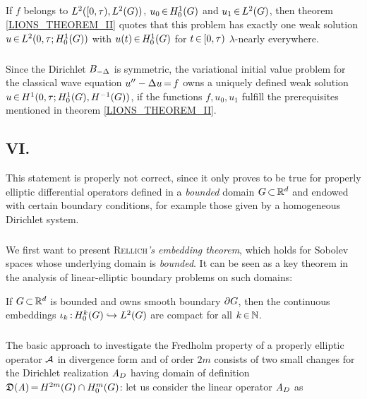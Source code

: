 \documentclass[11pt,twoside]{article}
\def\G{G}
\begin{document}
\subparagraph{}
If $f$ belongs to $L^2([0,\T), \Lh)$,
$u_0 \xeof \HN{1}{\G}$ and $u_1 \xeof \Lh$,
then theorem \ref{LIONS_THEOREM_II} quotes
that this problem has exactly one weak solution $u \xeof L^2(0,\T; \HN{1}{\G})$
with $u(t) \xeof \HN{1}{\G}$ for $t {\,\in\,} [0,\tau)$ $\lambda$-nearly everywhere.

\subparagraph{}
Since the Dirichlet $B_{-\Delta}$ is symmetric,
the variational initial value problem for the classical wave equation
$u'' - \Delta u {\,=\,} f$
owns a uniquely defined weak solution
$u \xeof H^1(0,\T; \HN{1}{\G}, H^{-1}(\G))$,
if the functions $f, u_0, u_1$ fulfill the prerequisites
mentioned in theorem \ref{LIONS_THEOREM_II}.

\subsection*{VI. {\TITLEF}}
This statement is properly not correct,
since it only proves to be true for properly elliptic differential operators
defined in a \textit{bounded} domain $\G \xsubset \Rd$
and endowed with certain boundary conditions,
for example those given by a homogeneous Dirichlet system.

\subparagraph{} %
We first want to present \textsc{Rellich}\textit{'s embedding theorem},
which holds for Sobolev spaces whose underlying domain is \textit{bounded}.
It can be seen as a key theorem in the analysis
of linear-elliptic boundary problems on such domains:

\begin{theorem1}\label{RELLICH_EMBEDDING_THEOREM}
If $\G \xsubset \Rd$ is bounded and owns smooth boundary $\bndG$,
then the continuous embeddings
$\iota_k \: \HN{k}{\G} \hookrightarrow \Lh$ are compact for all $k {\,\in\,} {\mathbb{N}}$.
\end{theorem1}


\subparagraph{} %
The basic approach to investigate the Fredholm property
of a properly elliptic operator ${\mathcal{A}}$ in divergence form
and of order $2m$
consists of two small changes for the Dirichlet realization $\mathit{A}_D$
having domain of definition $\domain{\linA} \eq H^{2m}(\G) \cap \HN{m}{\G}$:
let us consider the linear operator $\mathit{A}_D$ as
\end{document}
